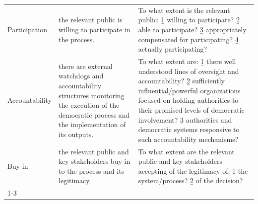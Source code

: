 \begin{tabular}{@{} >{\small}l@{} >{\raggedright\arraybackslash\small}p{} >{\raggedright\arraybackslash\small}p{}@{}}
    Participation
        & the relevant public is willing to participate in the process.
        & To what extent is the relevant public: \b{1} willing to participate? \b{2} able to participate? \b{3} appropriately compensated for participating? \b{4} actually participating? \\
        
    Accountability
        & there are external watchdogs and accountability structures monitoring the execution of the democratic process and the implementation of its outputs.
        & To what extent are: \b{1} there well understood lines of oversight and accountability? \b{2} sufficiently influential/powerful organizations focused on holding authorities to their promised levels of democratic involvement? \b{3} authorities and democratic systems responsive to such accountability mechanisms? \\
        
    Buy-in
        & the relevant public and key stakeholders buy-in to the process and its legitimacy.
        & To what extent are the relevant public and key stakeholders accepting of the legitimacy of: \b{1} the system/process? \b{2} of the decision?\\
        
    
    \cmidrule[\heavyrulewidth]{1-3} %
\end{tabular}
